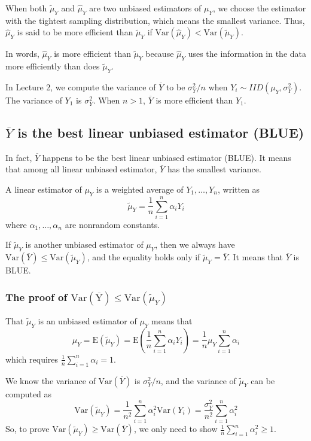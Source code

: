 \documentclass[a4paper,11pt]{article}
\begin{document}
When both \(\tilde{\mu}_Y\) and \(\hat{\mu}_Y\) are two unbiased
estimators of \(\mu_Y\), we choose the estimator with the tightest
sampling distribution, which means the smallest variance. Thus,
\(\hat{\mu}_Y\) is said to be more efficient than \(\tilde{\mu}_Y\) if
\(\mathrm{Var}(\hat{\mu}_Y) < \mathrm{Var}(\tilde{\mu}_Y)\).

In words, \(\hat{\mu}_Y\) is more efficient than \(\tilde{\mu}_Y\)
because \(\hat{\mu}_Y\) uses the information in the data more
efficiently than does \(\tilde{\mu}_Y\). 

In Lecture 2, we compute the variance of \(\overline{Y}\) to be
\(\sigma^2_Y / n\) when \(Y_i \sim IID(\mu_Y, \sigma^2_Y)\). The variance
of \(Y_1\) is \(\sigma^2_Y\). When \(n > 1\), \(\overline{Y}\) is more
efficient than \(Y_1\). 

\subsection{\(\overline{Y}\) is the best linear unbiased estimator (BLUE)}
\label{sec:org99c9ae6}

In fact, \(\overline{Y}\) happens to be the best linear unbiased
estimator (BLUE). It means that among all linear unbiased estimator,
\(\overline{Y}\) has the smallest variance. 

A linear estimator of \(\mu_Y\) is a weighted average of \(Y_1, \ldots,
Y_n\), written as
\[ \tilde{\mu}_Y = \frac{1}{n} \sum_{i=1}^n \alpha_i Y_i \]
where \(\alpha_1, \ldots, \alpha_n\) are nonrandom constants. 

If \(\tilde{\mu}_Y\) is another unbiased estimator of \(\mu_Y\), then we
always have \(\mathrm{Var}(\overline{Y}) \leq
\mathrm{Var}(\tilde{\mu}_Y)\), and the equality holds only if
\(\tilde{\mu}_Y = \overline{Y}\). It means that \(\overline{Y}\) is BLUE.

\subsubsection*{The proof of \(\mathrm{Var(\overline{Y})} \leq \mathrm{Var}(\tilde{\mu}_Y)\)}
\label{sec:orge32ac84}

That \(\tilde{\mu}_Y\) is an unbiased estimator of \(\mu_Y\) means that
\[\mu_Y = \mathrm{E}(\tilde{\mu}_Y) = \mathrm{E}\left( \frac{1}{n} \sum_{i=1}^n \alpha_i
Y_i \right) = \frac{1}{n} \mu_Y \sum_{i=1}^n \alpha_i \]
which requires \(\frac{1}{n} \sum_{i=1}^n \alpha_i = 1\). 

We know the variance of \(\mathrm{Var}(\overline{Y})\) is
\(\sigma^2_Y / n\), and the variance of \(\tilde{\mu}_Y\) can be computed as
\begin{equation*}
\mathrm{Var}(\tilde{\mu}_Y) = \frac{1}{n^2} \sum_{i=1}^n \alpha_i^2 \mathrm{Var}(Y_i) = \frac{\sigma^2_Y}{n^2} \sum_{i=1}^n \alpha_i^2 
\end{equation*}
So, to prove \(\mathrm{Var}(\tilde{\mu}_Y) \geq
\mathrm{Var}(\overline{Y})\), we only need to show
\(\frac{1}{n}\sum_{i=1}^n \alpha_i^2 \geq 1\).  
\end{document}
